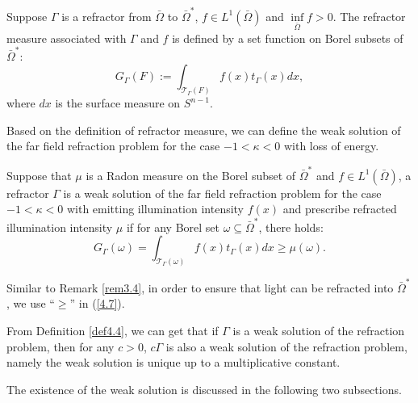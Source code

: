\documentclass[a4paper,12pt,]{article}
\newtheorem{remark}{\hskip\parindent\bf Remark}[section]%
\newtheorem{definition}{\hskip\parindent\bf Definition}[section]%
\numberwithin{equation}{section}
\numberwithin{equation}{section} \allowdisplaybreaks
\begin{document}
\begin{definition}
  Suppose $\Gamma$ is a refractor from $\bar{\Omega}$ to $\bar{\Omega}^{\ast}$, $f \in L^{1}(\bar{\Omega})$ and $\inf\limits_{\bar{\Omega}}f >0$. The refractor measure associated with $\Gamma$ and $f$ is defined by a set function on Borel subsets of $\bar{\Omega}^{\ast}$:
  \begin{equation}\label{4.6}
    G_{\Gamma}(F) := \int_{\mathcal{T}_{\Gamma}(F)}f(x)t_{\Gamma}(x)dx,
  \end{equation}
  where $dx$ is the surface measure on $S^{n-1}$.
  \label{def4.3}
\end{definition}

Based on the definition of refractor measure, we can define the weak solution of the far field refraction problem for the case $-1< \kappa <0$ with loss of energy.

\begin{definition}
  Suppose that $\mu$ is a Radon measure on the Borel subset of $\bar{\Omega}^{\ast}$ and $f \in L^{1}(\bar{\Omega})$, a refractor $\Gamma$ is a weak solution of the far field refraction problem for the case $-1 <\kappa <0$ with emitting illumination intensity $f(x)$ and prescribe refracted illumination intensity $\mu$ if for any Borel set $\omega \subseteq \bar{\Omega}^{\ast}$, there holds:
  \begin{equation}\label{4.7}
    G_{\Gamma}(\omega) = \int_{\mathcal{T}_{\Gamma}(\omega)}f(x)t_{\Gamma}(x)dx \geq \mu(\omega).
  \end{equation}
  \label{def4.4}
\end{definition}

\begin{remark}
    Similar to Remark \ref{rem3.4}, in order to ensure that light can be refracted into $\bar{\Omega}^{\ast}$, we use ``$\geq$'' in (\ref{4.7}).
  \label{rem4.3}
\end{remark}

\begin{remark}
  From Definition \ref{def4.4}, we can get that if $\Gamma$ is a weak solution of the refraction problem, then for any $c>0$, $c\Gamma$ is also a weak solution of the refraction problem, namely the weak solution is unique up to a multiplicative constant.
  \label{rem4.4}
\end{remark}

The existence of the weak solution is discussed in the following two subsections.
\end{document}
